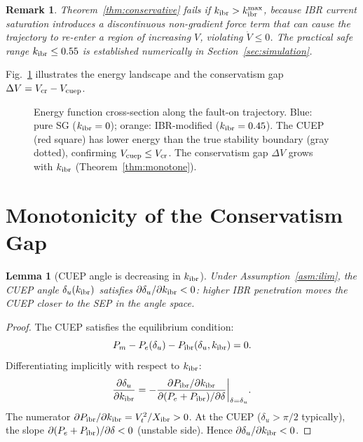 \documentclass[journal]{IEEEtran}
\newtheorem{lemma}{Lemma}
\newtheorem{remark}{Remark}
\newcommand{\kibr}{k_{\rm ibr}}
\newcommand{\Vcuep}{V_{\rm cuep}}
\newcommand{\Vcr}{V_{\rm cr}}
\newcommand{\deltau}{\delta_u}
\newcommand{\DeltaV}{\Delta V}
\newcommand{\Pm}{P_m}
\newcommand{\Pe}{P_e}
\begin{document}
\begin{remark}
Theorem~\ref{thm:conservative} fails if $\kibr > \kibr^{\max}$,
because IBR current saturation introduces a discontinuous
non-gradient force term that can cause the trajectory to re-enter
a region of increasing $V$, violating $\dot V \leq 0$.
The practical safe range $\kibr \leq 0.55$ is established numerically
in Section~\ref{sec:simulation}.
\end{remark}

Fig.~\ref{fig:energy_land} illustrates the energy landscape and the
conservatism gap $\DeltaV = \Vcr - \Vcuep$.

\begin{figure}[!t]
  \centering
  
  \caption{Energy function cross-section along the fault-on trajectory.
           Blue: pure SG ($\kibr = 0$); orange: IBR-modified
           ($\kibr = 0.45$).  The CUEP (red square) has lower energy
           than the true stability boundary (gray dotted), confirming
           $\Vcuep \leq \Vcr$.  The conservatism gap $\DeltaV$ grows
           with $\kibr$ (Theorem~\ref{thm:monotone}).}
  \label{fig:energy_land}
\end{figure}

\section{Monotonicity of the Conservatism Gap}
\label{sec:monotone}

\begin{lemma}[CUEP angle is decreasing in $\kibr$]
\label{lem:delta_monotone}
Under Assumption~\ref{asm:ilim}, the CUEP angle $\deltau(\kibr)$
satisfies $\partial\deltau/\partial\kibr < 0$: higher IBR penetration
moves the CUEP closer to the SEP in the angle space.
\end{lemma}

\begin{proof}
The CUEP satisfies the equilibrium condition:
\begin{equation}
  \Pm - \Pe(\deltau) - P_{\rm ibr}(\deltau, \kibr) = 0.
  \label{eq:cuep_eq}
\end{equation}
Differentiating implicitly with respect to $\kibr$:
\begin{equation}
  \frac{\partial \deltau}{\partial \kibr}
  = -\frac{\partial P_{\rm ibr}/\partial \kibr}
         {\partial(\Pe + P_{\rm ibr})/\partial\delta}\bigg|_{\delta=\deltau}.
  \label{eq:impl}
\end{equation}
The numerator $\partial P_{\rm ibr}/\partial\kibr = V_t^2/X_{\rm ibr} > 0$.
At the CUEP ($\deltau > \pi/2$ typically), the slope
$\partial(\Pe + P_{\rm ibr})/\partial\delta < 0$ (unstable side).
Hence $\partial\deltau/\partial\kibr < 0$.
\end{proof}
\end{document}
